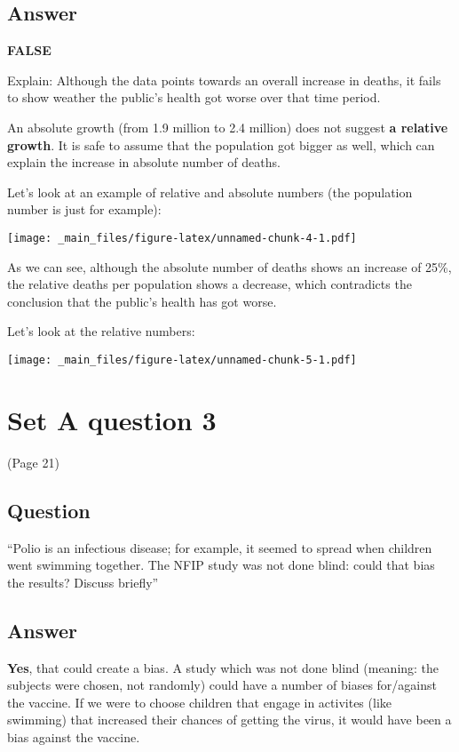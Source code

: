 \documentclass[
]{book}
\begin{document}
\hypertarget{answer}{%
\section{Answer}\label{answer}}

\textbf{FALSE}

Explain: Although the data points towards an overall increase in deaths,
it fails to show weather the public's health got worse over that time period.

An absolute growth (from 1.9 million to 2.4 million) does not suggest \textbf{a relative growth}.
It is safe to assume that the population got bigger as well, which can explain the increase in
absolute number of deaths.

Let's look at an example of relative and absolute numbers (the population number is just for example):

\texttt{[image: \_main\_files/figure-latex/unnamed-chunk-4-1.pdf]}

As we can see, although the absolute number of deaths shows an increase of 25\%, the relative deaths per population shows a decrease, which contradicts the conclusion that the public's health has got worse.

Let's look at the relative numbers:

\texttt{[image: \_main\_files/figure-latex/unnamed-chunk-5-1.pdf]}

\hypertarget{set-a-question-3}{%
\chapter{Set A question 3}\label{set-a-question-3}}

(Page 21)

\hypertarget{question-1}{%
\section{Question}\label{question-1}}

``Polio is an infectious disease; for example, it seemed to spread when children went swimming together. The
NFIP study was not done blind: could that bias the results? Discuss briefly''

\hypertarget{answer-1}{%
\section{Answer}\label{answer-1}}

\textbf{Yes}, that could create a bias.
A study which was not done blind (meaning: the subjects were chosen, not randomly) could have a number of biases for/against the vaccine.
If we were to choose children that engage in activites (like swimming) that increased their chances of getting the virus, it would have been a bias against the vaccine.
\end{document}
